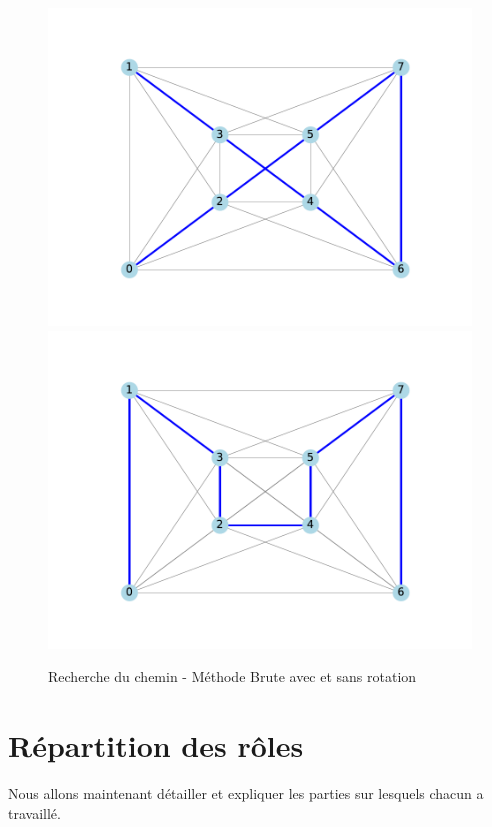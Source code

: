 \documentclass{article}
\begin{document}
\begin{figure}[h!]
	\centering
	\includegraphics[scale=0.4]{figs/best_path_data1_slow_turning.pdf}
	\includegraphics[scale=0.4]{figs/best_path_data1.pdf}
	\caption{Recherche du chemin - Méthode Brute avec et sans rotation}
	\label{tsp_turn_2}
\end{figure}

\section{Répartition des rôles}

Nous allons maintenant détailler et expliquer les parties sur lesquels chacun a travaillé.
\end{document}
